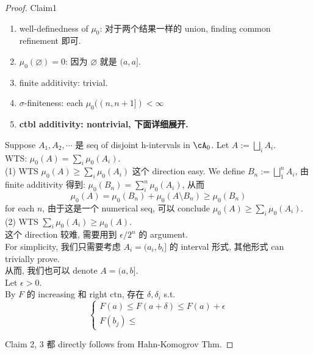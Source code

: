 \documentclass[lang=cn,11pt]{elegantbook}
\begin{document}
\begin{proof}
Claim1 
\begin{enumerate}
    \item well-definedness of $\mu_0$: 对于两个结果一样的 union, finding common refinement 即可.\\
    \item $\mu_0(\varnothing) = 0$: 因为 $\varnothing$ 就是 $(a,a]$.\\
    \item finite additivity: trivial.\\
    \item $\sigma$-finiteness: each $\mu_0((n, n+1]) < \infty$
    \item \textbf{ctbl additivity: nontrivial, 下面详细展开.}
\end{enumerate}
Suppose $A_1, A_2, \cdots$ 是 seq of disjoint h-intervals in $\cA_0$. Let $A := \bigsqcup_{i}A_i $.\\
WTS: $\mu_0(A) = \sum_i \mu_0(A_i)$.\\
(1) WTS $\mu_0(A) \geq \sum_i \mu_0(A_i)$
这个 direction easy. We define $B_n  := \bigsqcup_1^n A_i$, 由 finite additivity 得到: $\mu_0(B_n) = \sum_{i}^n \mu_0(A_i)$, 从而 
$$
\mu_0(A) = \mu_0(B_n) + \mu_0(A \setminus B_n) \geq \mu_0(B_n)
$$ for each $n$, 由于这是一个 numerical seq, 可以 conclude $\mu_0(A) \geq \sum_i \mu_0(A_i)$.
(2) WTS $\sum_i \mu_0(A_i) \geq \mu_0(A)$.\\
这个 direction 较难, 需要用到 $\epsilon / 2^n$ 的 argument.\\
For simplicity, 我们只需要考虑 $A_i = (a_i, b_i]$ 的 interval 形式, 其他形式 can trivially prove.\\
从而, 我们也可以 denote $A = (a,b]$.\\
Let $\epsilon > 0$.\\
By $F$ 的 increasing 和 right ctn, 存在 $\delta, \delta_i$ s.t.
$$
\begin{cases}
    F(a) \leq F(a+ \delta) \leq F(a) + \epsilon\\
    F(b_j) \leq 
\end{cases}
$$


Claim 2, 3 都 directly follows from Hahn-Komogrov Thm.
\end{proof}
\end{document}
